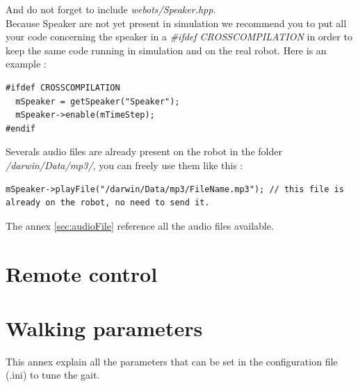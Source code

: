 \documentclass[a4paper, 12pt]{article}  		%
\begin{document}
And do not forget to include \textit{webots/Speaker.hpp}.\\

Because Speaker are not yet present in simulation we recommend you to put all your code concerning the speaker in a \textit{\#ifdef CROSSCOMPILATION} in order to keep the same code running in simulation and on the real robot. Here is an example :\\
\lstset{language=c++} 
\lstset{commentstyle=\textit} 
\begin{lstlisting} 
#ifdef CROSSCOMPILATION
  mSpeaker = getSpeaker("Speaker");
  mSpeaker->enable(mTimeStep);
#endif
\end{lstlisting}

Severals audio files are already present on the robot in the folder \textit{/darwin/Data/mp3/}, you can freely use them like this :\\
\lstset{language=c++} 
\lstset{commentstyle=\textit} 
\begin{lstlisting} 
mSpeaker->playFile("/darwin/Data/mp3/FileName.mp3"); // this file is already on the robot, no need to send it.
\end{lstlisting}

The annex \ref{sec:audioFile} reference all the audio files available.\\


\newpage
\section{Remote control}




\appendix
\newpage
{} %


\section{Walking parameters} \label{sec:walkParameter}

This annex explain all the parameters that can be set in the configuration file (.ini) to tune the gait.\\ 
\end{document}
